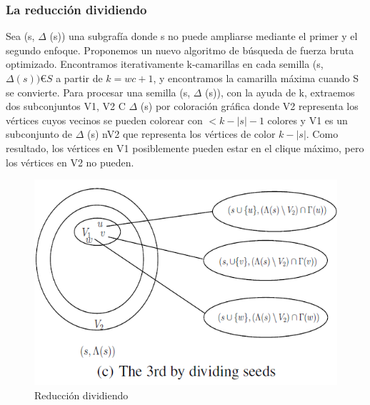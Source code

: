 \subsubsection{La reducción dividiendo}
Sea (s, \begin{math}\Delta\end{math} (s)) una subgrafía donde s no puede ampliarse mediante el primer y el segundo enfoque. Proponemos un nuevo algoritmo de búsqueda de fuerza bruta optimizado. Encontramos iterativamente k-camarillas en cada semilla (s, \begin{math}\Delta (s)) € S \end{math} a partir de \begin{math}k = wc + 1\end{math}, y encontramos la camarilla máxima cuando S se convierte. Para procesar una semilla (s, \begin{math}\Delta\end{math} (s)), con la ayuda de k, extraemos dos subconjuntos V1, V2 C \begin{math}\Delta\end{math} (s) por coloración gráfica donde V2 representa los vértices cuyos vecinos se pueden colorear con \begin{math}<k -|s| -1\end{math} colores y V1 es un subconjunto de \begin{math}\Delta\end{math} (s) nV2 que representa los vértices de color \begin{math} k-|s|\end{math}. Como resultado, los vértices en V1 posiblemente pueden estar en el clique máximo, pero los vértices en V2 no pueden.
\\
\begin{figure}[h!]
\centering
\includegraphics[scale=.8]{img/imagen8.png}
\caption{Reducción dividiendo}
\label{Comandos}
\end{figure}
\\
